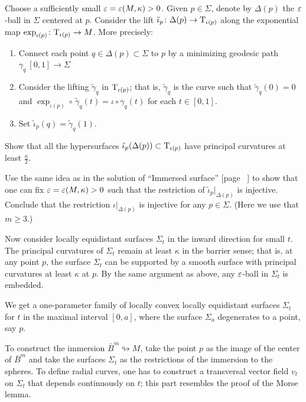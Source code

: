 Choose a sufficiently small $\varepsilon=\varepsilon(M,\kappa)>0$.
Given $p\in \Sigma$, denote by $\Delta(p)$ the $\varepsilon$-ball in $\Sigma$ centered at $p$.
Consider the lift $\tilde \iota_p\colon\Delta(p)\to \mathrm{T}_{\iota(p)}$ along the exponential map $\exp_{\iota(p)}\colon\mathrm{T}_{\iota(p)}\to M$.
More precisely:
\begin{enumerate}
\item Connect each point $q\in \Delta(p)\subset \Sigma$ to $p$
by a minimizing geodesic  path $\gamma_q\:[0,1]\to \Sigma$
\item Consider the lifting $\tilde\gamma_q$ in $\mathrm{T}_{\iota(p)}$;
that is, $\tilde\gamma_q$ is the curve such that $\tilde\gamma_q(0)=0$ 
and $\exp_{\iota(p)}\circ\,\tilde\gamma_q(t)=\iota\circ\gamma_q(t)$ for each $t\in[0,1]$.
 \item Set $\tilde \iota_p(q)=\tilde\gamma_q(1)$.
\end{enumerate}

Show that all the hypersurfaces $\tilde \iota_p(\Delta(p))\subset \mathrm{T}_{\iota(p)}$ have principal curvatures at least $\tfrac\kappa2$.

Use the same idea as in the solution of ``Immersed surface'' [page ~\pageref{Immersed surface}] to show that 
one can fix $\eps\z=\eps(M,\kappa)>0$ such that the restriction of $\tilde \iota_p|_{\Delta(p)}$ is injective.
Conclude that the restriction $\iota|_{\Delta(p)}$ is injective for any $p\in\Sigma$.
(Here we use that $m\ge 3$.)

Now consider locally equidistant surfaces $\Sigma_t$ in the inward direction for small $t$. 
The principal curvatures of $\Sigma_t$ remain at least $\kappa$ in the barrier sense;
that is, at any point $p$, the surface $\Sigma_t$ can be supported by a smooth surface with principal curvatures at least $\kappa$ at $p$.
By the same argument as above, any $\varepsilon$-ball in $\Sigma_t$ is embedded.

We get a one-parameter family of locally convex locally equidistant surfaces $\Sigma_t$
for $t$ in the maximal interval $[0,a]$,
where the surface $\Sigma_a$ degenerates to a point, say $p$. 

To construct the immersion $\bar B^m\looparrowright M$,
take the point $p$ as the image of the center of $\bar B^m$
and take the surfaces $\Sigma_t$ as the restrictions of the immersion to the spheres.
To define radial curves, one has to construct a transversal vector field $v_t$ on $\Sigma_t$ that depends continuously on $t$; this part resembles the proof of the Morse lemma.
\qeds

